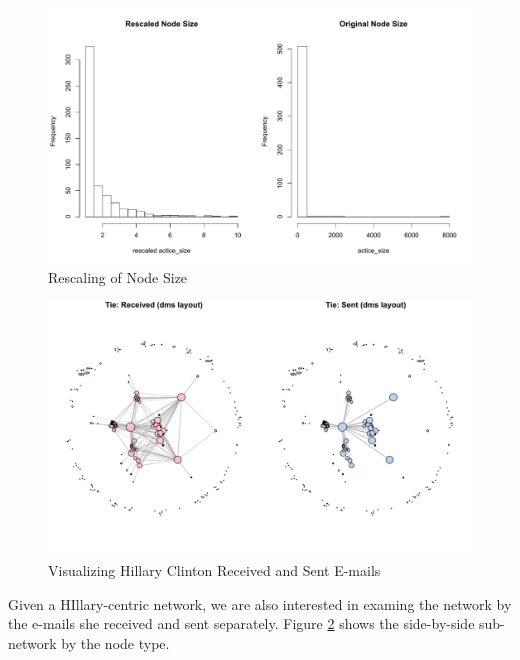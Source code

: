 \begin{figure}[ht]
\centering
\includegraphics[width=.9\textwidth]{zoe/report_rescaled_size}
\caption{Rescaling of Node Size}
\label{fig:rescalenode}
\end{figure}

\begin{figure}[ht]
\centering
\includegraphics[width=.9\textwidth]{zoe/report_network_compare}
\caption{Visualizing Hillary Clinton Received and Sent E-mails}
\label{fig:splitnw}
\end{figure}

Given a HIllary-centric network, we are also interested in examing the network by the e-mails she received and sent separately. Figure \ref{fig:splitnw} shows the side-by-side sub-network by the node type.